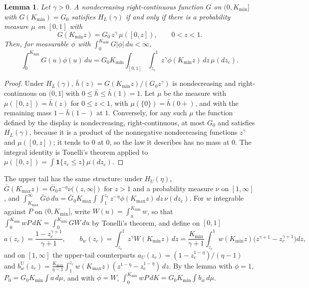 \documentclass[11pt]{article}
\newtheorem{lemma}[proposition]{Lemma}
\theoremstyle{remark}
\begin{document}
\begin{lemma}
Let $\gamma>0$. A nondecreasing right-continuous function $G$ on $(0,K_{\min}]$ with $G(K_{\min})=G_0$ satisfies $H_L(\gamma)$ if and only if there is a probability measure $\mu$ on $[0,1]$ with
\[
G(K_{\min}z)=G_0\,z^\gamma\,\mu([0,z]),\qquad 0<z<1.
\]
Then, for measurable $\phi$ with $\int_0^{K_{\min}}G|\phi|\,du<\infty$,
\[
\int_0^{K_{\min}}G(u)\phi(u)\,du=G_0K_{\min}\int_{[0,1]}\int_{z_c}^1z^\gamma\phi(K_{\min}z)\,dz\,\mu(dz_c).
\]
\end{lemma}

\begin{proof}
Under $H_L(\gamma)$, $\bar h(z)=G(K_{\min}z)/(G_0z^\gamma)$ is nondecreasing and right-continuous on $(0,1]$ with $0\le\bar h\le\bar h(1)=1$. Let $\mu$ be the measure with $\mu([0,z])=\bar h(z)$ for $0\le z<1$, with $\mu(\{0\})=\bar h(0+)$, and with the remaining mass $1-\bar h(1-)$ at $1$. Conversely, for any such $\mu$ the function defined by the display is nondecreasing, right-continuous, at most $G_0$ and satisfies $H_L(\gamma)$, because it is a product of the nonnegative nondecreasing functions $z^\gamma$ and $\mu([0,z])$; it tends to $0$ at $0$, so the law it describes has no mass at $0$. The integral identity is Tonelli's theorem applied to $\mu([0,z])=\int\mathbf 1\{z_c\le z\}\,\mu(dz_c)$.
\end{proof}

The upper tail has the same structure: under $H_U(\eta)$, $\bar G(K_{\max}z)=\bar G_0z^{-\eta}\nu((z,\infty])$ for $z>1$ and a probability measure $\nu$ on $[1,\infty]$, and $\int_{K_{\max}}^\infty\bar G\phi\,du=\bar G_0K_{\max}\int\int_1^{z_c}z^{-\eta}\phi(K_{\max}z)\,dz\,\nu(dz_c)$. For $w$ integrable against $P$ on $(0,K_{\min}]$, write $W(u)=\int_u^{K_{\min}}w$, so that $\int_0^{K_{\min}}wP\,dK=\int_0^{K_{\min}}GW\,du$ by Tonelli's theorem, and define on $[0,1]$
\[
a(z_c)=\frac{1-z_c^{\gamma+1}}{\gamma+1},\qquad b_w(z_c)=\int_{z_c}^1z^\gamma W(K_{\min}z)\,dz=\frac{K_{\min}}{\gamma+1}\int_{z_c}^1w(K_{\min}z)\bigl(z^{\gamma+1}-z_c^{\gamma+1}\bigr)dz,
\]
and on $[1,\infty]$ the upper-tail counterparts $a_U(z_c)=(1-z_c^{1-\eta})/(\eta-1)$ and $b^U_w(z_c)=\frac{K_{\max}}{\eta-1}\int_1^{z_c}w(K_{\max}z)(z^{1-\eta}-z_c^{1-\eta})\,dz$. By the lemma with $\phi=1$, $P_0=G_0K_{\min}\int a\,d\mu$, and with $\phi=W$, $\int_0^{K_{\min}}wP\,dK=G_0K_{\min}\int b_w\,d\mu$.
\end{document}

